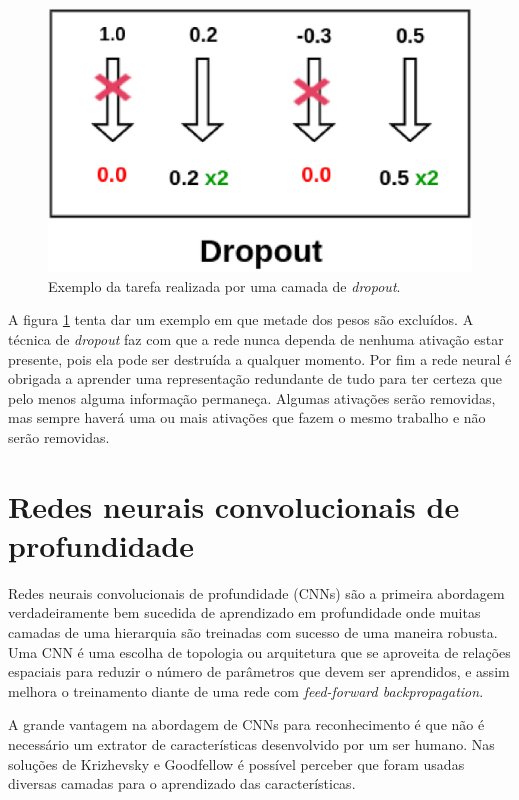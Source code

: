 \begin{figure}[H]
\centering
\includegraphics[scale=0.7]{imagens/dropout.eps}
\caption{Exemplo da tarefa realizada por uma camada de \textit{dropout}.}
\label{fig:dropout}
\end{figure}

A figura \ref{fig:dropout} tenta dar um exemplo em que metade dos
pesos são excluídos. A técnica de \textit{dropout} faz com que a rede
nunca dependa de nenhuma ativação estar presente, pois ela pode ser
destruída a qualquer momento. Por fim a rede neural é obrigada a
aprender uma representação redundante de tudo para ter certeza que
pelo menos alguma informação permaneça. Algumas ativações serão
removidas, mas sempre haverá uma ou mais ativações que fazem o mesmo
trabalho e não serão removidas.

\section{Redes neurais convolucionais de profundidade}

Redes neurais convolucionais de profundidade (CNNs) são a primeira
abordagem verdadeiramente bem sucedida de aprendizado em profundidade
onde muitas camadas de uma hierarquia são treinadas com sucesso de uma
maneira robusta. Uma CNN é uma escolha de topologia ou arquitetura que
se aproveita de relações espaciais para reduzir o número de parâmetros
que devem ser aprendidos, e assim melhora o treinamento diante de uma
rede com \textit{feed-forward backpropagation}\cite{Arel2010}.

A grande vantagem na abordagem de CNNs para reconhecimento é que não é
necessário um extrator de características desenvolvido por um ser
humano. Nas soluções de Krizhevsky\cite{Krizhevsky} e
Goodfellow\cite{Goodfellow} é possível perceber que foram usadas
diversas camadas para o aprendizado das características.

